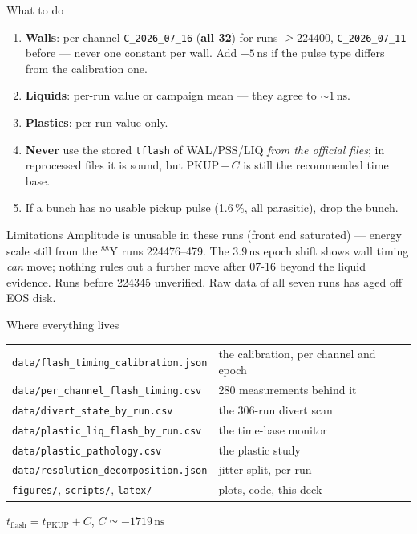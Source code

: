\documentclass[aspectratio=169,10pt]{beamer}
\newcommand{\ns}{\,\mathrm{ns}}
\newcommand{\hl}[1]{\textcolor{orange!75!black}{\textbf{#1}}}
\begin{document}
\begin{frame}{What to do}
\begin{enumerate}\setlength\itemsep{0.55em}
  \item \textbf{Walls}: per-channel \texttt{C\_2026\_07\_16} (\hl{all 32}) for
        runs $\ge224400$, \texttt{C\_2026\_07\_11} before --- never one constant
        per wall. Add $-5\ns$ if the pulse type differs from the calibration one.
  \item \textbf{Liquids}: per-run value or campaign mean --- they agree to
        ${\sim}1\ns$.
  \item \textbf{Plastics}: per-run value only.
  \item \hl{Never} use the stored \texttt{tflash} of WAL/PSS/LIQ \emph{from the
        official files}; in reprocessed files it is sound, but PKUP\,$+\,C$ is
        still the recommended time base.
  \item If a bunch has no usable pickup pulse (1.6\,\%, all parasitic), drop the
        bunch.
\end{enumerate}
\vspace{0.8em}
\begin{block}{Limitations}
{\small Amplitude is unusable in these runs (front end saturated) --- energy
scale still from the $^{88}$Y runs 224476--479. The $3.9\ns$ epoch shift shows
wall timing \emph{can} move; nothing rules out a further move after 07-16 beyond
the liquid evidence. Runs before 224345 unverified. Raw data of all seven runs
has aged off EOS disk.}
\end{block}
\end{frame}

\begin{frame}{Where everything lives}
\small
\begin{tabular}{ll}
\toprule
\texttt{data/flash\_timing\_calibration.json} & the calibration, per channel and epoch \\
\texttt{data/per\_channel\_flash\_timing.csv} & 280 measurements behind it \\
\texttt{data/divert\_state\_by\_run.csv} & the 306-run divert scan \\
\texttt{data/plastic\_liq\_flash\_by\_run.csv} & the time-base monitor \\
\texttt{data/plastic\_pathology.csv} & the plastic study \\
\texttt{data/resolution\_decomposition.json} & jitter split, per run \\
\texttt{figures/}, \texttt{scripts/}, \texttt{latex/} & plots, code, this deck \\
\bottomrule
\end{tabular}
\vspace{1.2em}

\begin{center}
\Large
$t_\mathrm{flash} = t_\mathrm{PKUP} + C$, \qquad $C \simeq -1719\ns$
\end{center}
\end{frame}
\end{document}

